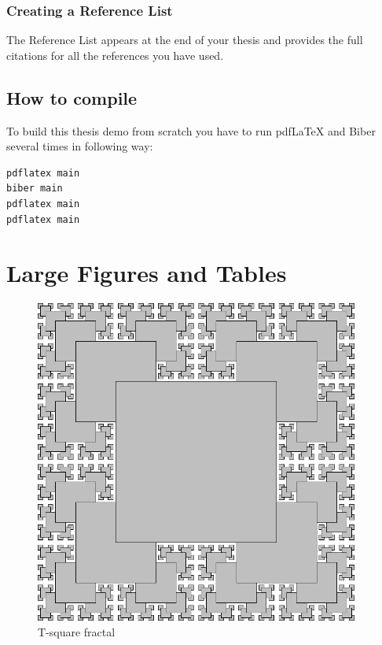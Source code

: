 \documentclass[english,master,dept460,male,cpp,cpdeclaration]{diploma}
\begin{document}
\subsubsection{Creating a Reference List}
The Reference List appears at the end of your thesis and provides the full citations for all the references you have used.  

\subsection{How to compile}
To build this thesis demo from scratch you have to run pdf\LaTeX{} and Biber several times in following way:
\begin{verbatim}
pdflatex main
biber main
pdflatex main
pdflatex main
\end{verbatim}


\printbibliography[heading=bibintoc]

\appendix

\section{Large Figures and Tables}
\label{sec:Appendix1}
\begin{figure}[!h]
	\centering
	\includegraphics[width=0.95\textwidth]{Figures/FigC.pdf}
	\caption{T-square fractal}
	\label{fig:TSquareFractal}
\end{figure}
\end{document}
